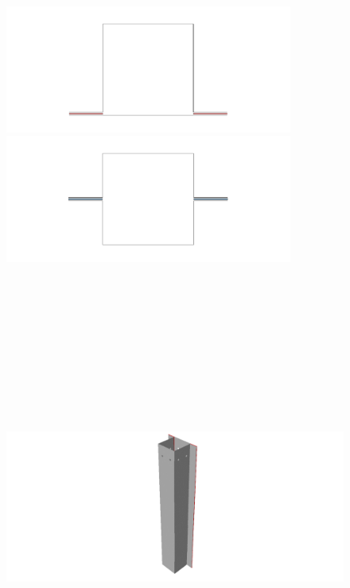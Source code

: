 \documentclass[cmfonts]{witpress}
\begin{document}
\begin{figure}
	\centering
	\begin{minipage}[b]{.45\columnwidth}
		\centering
		\includegraphics[height=42mm]{figures/IMG_CUTRES/A_section}
	\end{minipage}
	\hfill
	\begin{minipage}[b]{.45\columnwidth}
		\centering
		\includegraphics[height=42mm]{figures/IMG_CUTRES/B_section}
	\end{minipage}
\\[10mm]
\begin{minipage}[b]{.4\linewidth}
	\centering
	\includegraphics[height=135mm]{figures/IMG_CUTRES/A_tube}

\end{minipage}
\end{figure}
\end{document}
